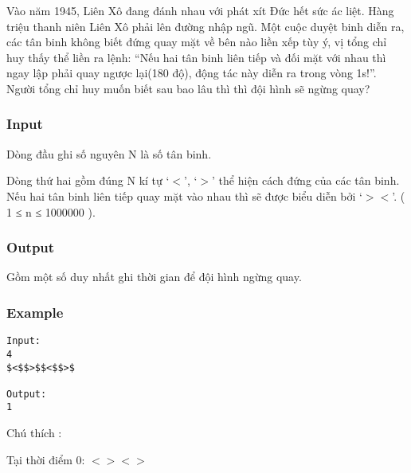 



   Vào năm 1945, Liên Xô đang đánh nhau với phát xít Đức hết sức ác liệt. Hàng triệu thanh niên Liên Xô phải lên đường nhập ngũ. Một cuộc duyệt binh diễn ra, các tân binh không biết đứng quay mặt về bên nào liền xếp tùy ý, vị tổng chỉ huy thấy thể liền ra lệnh: “Nếu hai tân binh liên tiếp và đối mặt với nhau thì ngay lập phải quay ngược lại(180 độ), động tác này diễn ra trong vòng 1s!”. Người tổng chỉ huy muốn biết sau bao lâu thì thì đội hình sẽ ngừng quay?  

\subsubsection{   Input  }

   Dòng đầu ghi số nguyên N là số tân binh.   


   Dòng thứ hai gồm đúng N kí tự ‘$<$’, ‘$>$’ thể hiện cách đứng của các tân binh. Nếu hai tân binh liên tiếp quay mặt vào nhau thì sẽ được biểu diễn bởi ‘$>$$<$’. ( 1 ≤ n ≤ 1000000 ).  

\subsubsection{   Output  }

   Gồm một số duy nhất ghi thời gian để đội hình ngừng quay.  

\subsubsection{   Example  }
\begin{verbatim}
Input:
4
$<$$>$$<$$>$

Output:
1
\end{verbatim}  Chú thích :  


  Tại thời điểm 0: $<$$>$$<$$>$  


